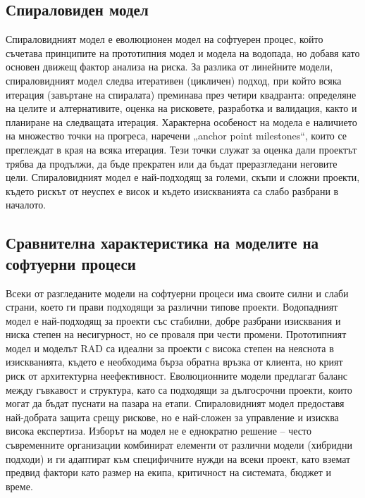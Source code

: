 \documentclass{article}
\renewcommand{\\}{\newline}
\begin{document}
\subsection{Спираловиден модел}
Спираловидният модел е еволюционен модел на софтуерен процес, който съчетава принципите на прототипния модел и модела на водопада, но добавя като основен движещ фактор анализа на риска. За разлика от линейните модели, спираловидният модел следва итеративен (цикличен) подход, при който всяка итерация (завъртане на спиралата) преминава през четири квадранта: определяне на целите и алтернативите, оценка на рисковете, разработка и валидация, както и планиране на следващата итерация. Характерна особеност на модела е наличието на множество точки на прогреса, наречени „anchor point milestones“, които се преглеждат в края на всяка итерация. Тези точки служат за оценка дали проектът трябва да продължи, да бъде прекратен или да бъдат преразгледани неговите цели. Спираловидният модел е най-подходящ за големи, скъпи и сложни проекти, където рискът от неуспех е висок и където изискванията са слабо разбрани в началото.

\subsection{Сравнителна характеристика на моделите на софтуерни процеси}
Всеки от разгледаните модели на софтуерни процеси има своите силни и слаби страни, което ги прави подходящи за различни типове проекти. Водопадният модел е най-подходящ за проекти със стабилни, добре разбрани изисквания и ниска степен на несигурност, но се проваля при чести промени. Прототипният модел и моделът RAD са идеални за проекти с висока степен на неяснота в изискванията, където е необходима бърза обратна връзка от клиента, но крият риск от архитектурна неефективност. Еволюционните модели предлагат баланс между гъвкавост и структура, като са подходящи за дългосрочни проекти, които могат да бъдат пуснати на пазара на етапи. Спираловидният модел предоставя най-добрата защита срещу рискове, но е най-сложен за управление и изисква висока експертиза. Изборът на модел не е еднократно решение – често съвременните организации комбинират елементи от различни модели (хибридни подходи) и ги адаптират към специфичните нужди на всеки проект, като вземат предвид фактори като размер на екипа, критичност на системата, бюджет и време.
\end{document}
